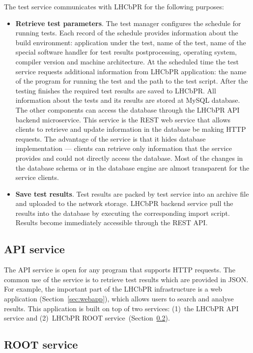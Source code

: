 \documentclass[10pt]{iopart}
\begin{document}
The test service communicates with LHCbPR for the following purposes:
\begin{itemize}
\item \textbf{Retrieve test parameters}. The test manager configures the schedule
for running tests. Each record of the schedule provides information about the
build environment: application under the test, name of the test, name of the
special software handler for test results postprocessing, operating system,
compiler version and machine architecture. At the scheduled time the test service
requests additional information from LHCbPR application: the name of the
program for running the test and the path to the test script. After the testing finishes
the required  test results are saved to LHCbPR. All information about the tests
and its results are stored at MySQL database. The other components can access the
database through the LHCbPR API backend microservice. This service is the REST web
service that allows clients to retrieve and update information in the database be making
HTTP requests. The advantage of the service is that it hides database
implementation --- clients can retrieve only information that the service provides
and could not directly access the database. Most of the changes in the database schema
or in the database engine are almost transparent for the service clients.

\item \textbf{Save test results}. Test results are packed by test service into
an archive file and uploaded to the network storage. LHCbPR backend service pull
the results into the database by executing the corresponding import script.
Results become immediately accessible through the REST API.
\end{itemize}

\subsection{API  service}
The API service is open for any program that supports HTTP
requests. The common use of the service is to retrieve test results which are
provided in JSON. For example, the important part of the LHCbPR
infrastructure is a web application (Section~\ref{sec:webapp}), which allows users
to search and analyse results. This
application is built on top of two services: (1)~the LHCbPR API service
and (2)~LHCbPR ROOT service~(Section~\ref{sec:rootapp}). 


\subsection{ROOT service}\label{sec:rootapp}
\end{document}
